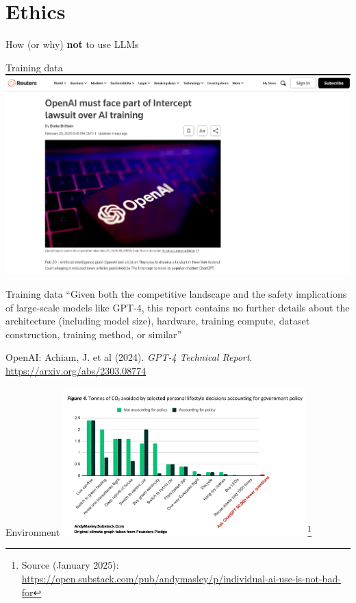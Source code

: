 \documentclass[t,xcolor={dvipsnames},final,aspectratio=169]{beamer}
\begin{document}
\section{Ethics}
\begin{frame}{}
\huge{How (or why) \textbf{not} to use LLMs}
\end{frame}

\begin{frame}{Training data}
\includegraphics[width=\textwidth]{img/trainingdata.png}
\end{frame}

\begin{frame}{Training data}
``Given both the competitive landscape and the safety implications of large-scale models like GPT-4, this report contains no further details about the architecture (including model size), hardware, training compute, dataset construction, training method, or similar''

OpenAI: Achiam, J. et al (2024). \textit{GPT-4 Technical Report}. \url{https://arxiv.org/abs/2303.08774}
\end{frame}

{
\begin{frame}{Environment}
\includegraphics[width=0.7\textwidth]{img/emissions.jpg}
\footnote{Source (January 2025): \url{https://open.substack.com/pub/andymasley/p/individual-ai-use-is-not-bad-for}}
\end{frame}
}
\end{document}
